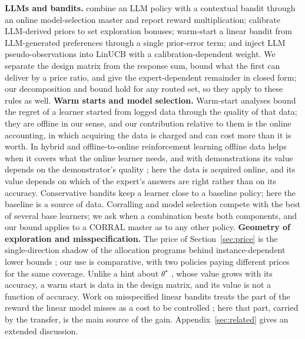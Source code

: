 \documentclass[anon]{alt2027} %
\begin{document}
\textbf{LLMs and bandits.} \citet{chen2024llmdecision} combine an LLM policy
with a contextual bandit through an online model-selection master and report
reward multiplication; \citet{huangcontextual} calibrate LLM-derived priors to
set exploration bonuses; \citet{jumpstart2026} warm-start a linear bandit from
LLM-generated preferences through a single prior-error term; and
\citet{calibgated2026} inject LLM pseudo-observations into LinUCB with a
calibration-dependent weight. We separate the design matrix from the response
sum, bound what the first can deliver by a price ratio, and give the
expert-dependent remainder in closed form; our decomposition and bound hold
for any routed set, so they apply to these rules as well.
\textbf{Warm starts and model selection.} Warm-start analyses
\citep{bastani2021mostly,zhang2019warm} bound the regret of a learner started
from logged data through the quality of that data; they are offline in our
sense, and our contribution relative to them is the online accounting, in
which acquiring the data is charged and can cost more than it is worth. In
hybrid and offline-to-online reinforcement learning
\citep{song2022hybrid,wagenmaker2023leveraging} offline data helps when it covers what
the online learner needs, and with demonstrations its value depends on the
demonstrator's quality \citep{hao2023leveraging}; here the data is acquired
online, and its value depends on which of the expert's answers are right
rather than on its accuracy. Conservative bandits \citep{wu2016conservative} keep a learner close to a baseline policy; here the
baseline is a source of data.
Corralling and model selection
\citep{agarwal2017corralling,pacchiano2020model,marinov2021pareto} compete
with the best of several base learners; we ask when a combination beats both
components, and our bound applies to a CORRAL master as to any other policy.
\textbf{Geometry of exploration and misspecification.} The price of
Section~\ref{sec:price} is the single-direction shadow of the allocation
programs behind instance-dependent lower bounds
\citep{graves1997asymptotically,lattimore2017end}; our use is comparative,
with two policies paying different prices for the same coverage. Unlike a
hint about $\theta^\star$ \citep{cutkosky2022leveraging}, whose value grows
with its accuracy, a warm start is data in the design matrix, and its value
is not a function of accuracy. Work on misspecified linear bandits treats the
part of the reward the linear model misses as a cost to be controlled
\citep{ghosh2017misspecified,lattimore2020learning,foster2020adapting}; here that part, carried by the transfer,
is the main source of the gain. Appendix~\ref{sec:related} gives an extended
discussion.
\end{document}
